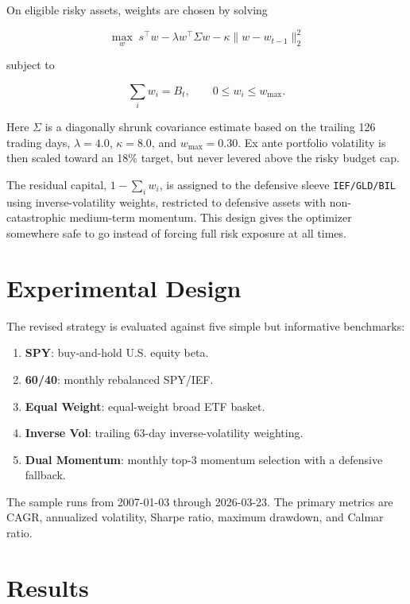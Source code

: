 \documentclass[11pt]{article}
\begin{document}
On eligible risky assets, weights are chosen by solving

\begin{equation}
\max_{w} \; s^\top w - \lambda w^\top \Sigma w - \kappa \lVert w - w_{t-1} \rVert_2^2
\end{equation}

subject to

\begin{equation}
\sum_i w_i = B_t, \qquad 0 \le w_i \le w_{\max}.
\end{equation}

Here $\Sigma$ is a diagonally shrunk covariance estimate based on the trailing 126 trading days, $\lambda = 4.0$, $\kappa = 8.0$, and $w_{\max} = 0.30$. Ex ante portfolio volatility is then scaled toward an 18\% target, but never levered above the risky budget cap.

The residual capital, $1 - \sum_i w_i$, is assigned to the defensive sleeve \texttt{IEF/GLD/BIL} using inverse-volatility weights, restricted to defensive assets with non-catastrophic medium-term momentum. This design gives the optimizer somewhere safe to go instead of forcing full risk exposure at all times.

\section{Experimental Design}

The revised strategy is evaluated against five simple but informative benchmarks:

\begin{enumerate}
    \item \textbf{SPY}: buy-and-hold U.S. equity beta.
    \item \textbf{60/40}: monthly rebalanced SPY/IEF.
    \item \textbf{Equal Weight}: equal-weight broad ETF basket.
    \item \textbf{Inverse Vol}: trailing 63-day inverse-volatility weighting.
    \item \textbf{Dual Momentum}: monthly top-3 momentum selection with a defensive fallback.
\end{enumerate}

The sample runs from 2007-01-03 through 2026-03-23. The primary metrics are CAGR, annualized volatility, Sharpe ratio, maximum drawdown, and Calmar ratio.

\section{Results}
\end{document}

